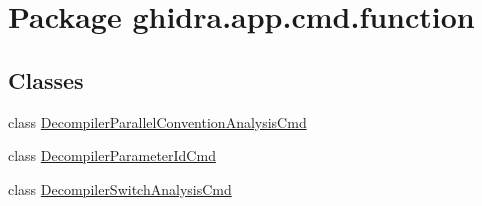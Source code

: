 \hypertarget{namespaceghidra_1_1app_1_1cmd_1_1function}{}\section{Package ghidra.\+app.\+cmd.\+function}
\label{namespaceghidra_1_1app_1_1cmd_1_1function}
\subsection*{Classes}
\begin{DoxyCompactItemize}
\item 
class \mbox{\hyperlink{classghidra_1_1app_1_1cmd_1_1function_1_1_decompiler_parallel_convention_analysis_cmd}{Decompiler\+Parallel\+Convention\+Analysis\+Cmd}}
\item 
class \mbox{\hyperlink{classghidra_1_1app_1_1cmd_1_1function_1_1_decompiler_parameter_id_cmd}{Decompiler\+Parameter\+Id\+Cmd}}
\item 
class \mbox{\hyperlink{classghidra_1_1app_1_1cmd_1_1function_1_1_decompiler_switch_analysis_cmd}{Decompiler\+Switch\+Analysis\+Cmd}}
\end{DoxyCompactItemize}
